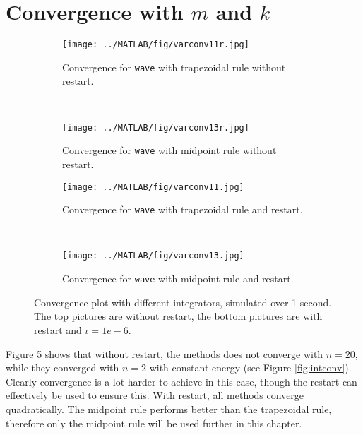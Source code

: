 \section{Convergence with $m$ and $k$} %
\label{sec:vconv}
\begin{figure}[H]
        \centering
		\begin{subfigure}[b]{0.3\textwidth}
                \texttt{[image: ../MATLAB/fig/varconv11r.jpg]}
                \caption{ Convergence for \texttt{wave} with trapezoidal rule without restart. }
                \label{fig:varconv11r}
        \end{subfigure}%
        ~
        \begin{subfigure}[b]{0.3\textwidth}
                \texttt{[image: ../MATLAB/fig/varconv13r.jpg]}
                \caption{ Convergence for \texttt{wave} with midpoint rule without restart.\\ }
                \label{fig:varconv13r}
        \end{subfigure}
        \begin{subfigure}[b]{0.3\textwidth}
                \texttt{[image: ../MATLAB/fig/varconv11.jpg]}
                \caption{ Convergence for \texttt{wave} with trapezoidal rule and restart. }
                \label{fig:varconv11}
        \end{subfigure}%
        ~
        \begin{subfigure}[b]{0.3\textwidth}
                \texttt{[image: ../MATLAB/fig/varconv13.jpg]}
                \caption{ Convergence for \texttt{wave} with midpoint rule and restart. }
                \label{fig:varconv13}
        \end{subfigure}

        \caption{ Convergence plot with different integrators, simulated over 1 second. The top pictures are without restart, the bottom pictures are with restart and $\iota = 1e-6$. }
        \label{fig:varconv}
\end{figure}

Figure \ref{fig:varconv} shows that without restart, the methods does not converge with $n = 20$, while they converged with $n = 2$ with constant energy (see Figure \ref{fig:intconv}). Clearly convergence is a lot harder to achieve in this case, though the restart can effectively be used to ensure this. With restart, all methods converge quadratically. The midpoint rule performs better than the trapezoidal rule, therefore only the midpoint rule will be used further in this chapter.\\

